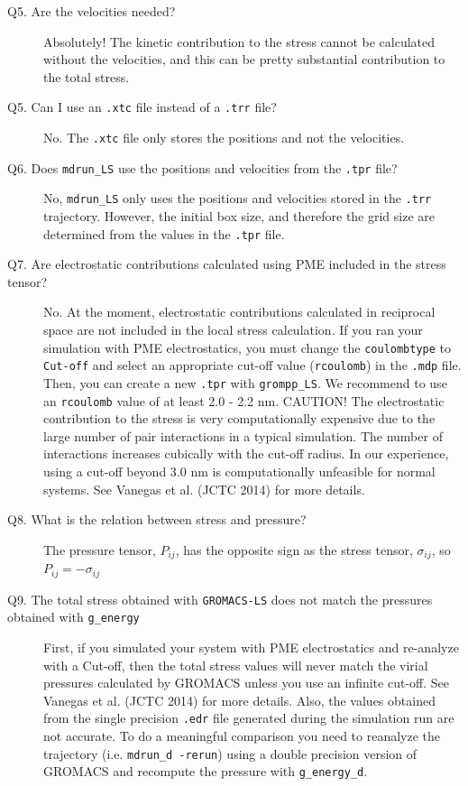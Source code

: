 \documentclass[10pt,letterpaper,notitlepage]{article}
\begin{document}
\begin{description}
\item[Q5. Are the velocities needed?] Absolutely! The kinetic contribution to the stress cannot be calculated without the velocities, and this can be pretty substantial contribution to the total stress.

\item[Q5. Can I use an \texttt{.xtc} file instead of a \texttt{.trr} file?] No. The \texttt{.xtc} file only stores the positions and not the velocities.

\item[Q6. Does \texttt{mdrun\_LS} use the positions and velocities from the \texttt{.tpr} file?] No, \texttt{mdrun\_LS} only uses the positions and velocities stored in the \texttt{.trr} trajectory. However, the initial box size, and therefore the grid size are determined from the values in the \texttt{.tpr} file.

\item[Q7. Are electrostatic contributions calculated using PME included in the stress tensor?] No. At the moment, electrostatic contributions calculated in reciprocal space are not included in the local stress calculation. If you ran your simulation with PME electrostatics, you must change the \texttt{coulombtype} to \texttt{Cut-off} and select an appropriate cut-off value (\texttt{rcoulomb}) in the \texttt{.mdp} file. Then, you can create a new \texttt{.tpr} with \texttt{grompp\_LS}. We recommend to use an \texttt{rcoulomb} value of at least 2.0 - 2.2 nm. CAUTION! The electrostatic contribution to the stress is very computationally expensive due to the large number of pair interactions in a typical simulation. The number of interactions increases cubically with the cut-off radius. In our experience, using a cut-off beyond 3.0 nm is computationally unfeasible for normal systems. See Vanegas et al. (JCTC 2014) for more details.

\item[Q8. What is the relation between stress and pressure?] The pressure tensor, $P_{ij}$, has the opposite sign as the stress tensor, $\sigma_{ij}$, so $P_{ij} = -\sigma_{ij}$

\item[Q9. The total stress obtained with \texttt{GROMACS-LS} does not match the pressures obtained with \texttt{g\_energy}] First, if you simulated your system with PME electrostatics and re-analyze with a Cut-off, then the total stress values will never match the virial pressures calculated by GROMACS unless you use an infinite cut-off. See Vanegas et al. (JCTC 2014) for more details. Also, the values obtained from the single precision \texttt{.edr} file generated during the simulation run are not accurate. To do a meaningful comparison you need to reanalyze the trajectory (i.e. \texttt{mdrun\_d -rerun}) using a double precision version of GROMACS and recompute the pressure with \texttt{g\_energy\_d}.


\end{description}
\end{document}

